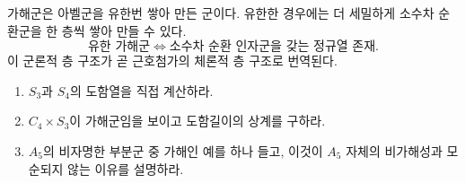 \begin{keyidea}
가해군은 아벨군을 유한번 쌓아 만든 군이다. 유한한 경우에는 더 세밀하게 소수차 순환군을 한 층씩 쌓아 만들 수 있다.
\[
  \boxed{
  \text{유한 가해군}
  \Longleftrightarrow
  \text{소수차 순환 인자군을 갖는 정규열 존재}.}
\]
이 군론적 층 구조가 곧 근호첨가의 체론적 층 구조로 번역된다.
\end{keyidea}

\begin{checkpoint}
\begin{enumerate}[label=(\alph*)]
  \item $S_3$과 $S_4$의 도함열을 직접 계산하라.
  \item $C_4\times S_3$이 가해군임을 보이고 도함길이의 상계를 구하라.
  \item $A_5$의 비자명한 부분군 중 가해인 예를 하나 들고, 이것이 $A_5$ 자체의 비가해성과 모순되지 않는 이유를 설명하라.
\end{enumerate}
\end{checkpoint}
